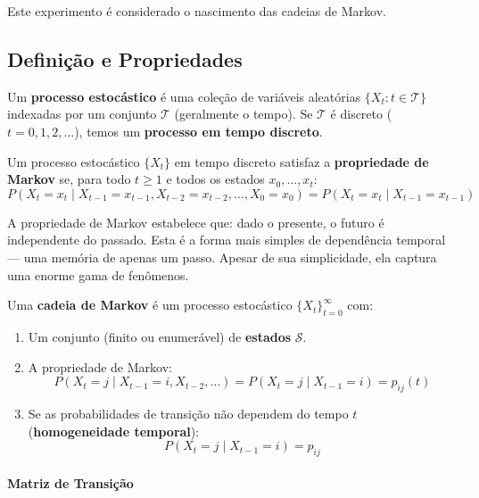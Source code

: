 \documentclass{tufte-handout}
\begin{document}
Este experimento é considerado o nascimento das cadeias de Markov.

\subsection{Definição e Propriedades}

\begin{defn}
    Um \textbf{processo estocástico} é uma coleção de variáveis aleatórias
    $\{X_t : t \in \mathcal{T}\}$ indexadas por um conjunto $\mathcal{T}$ (geralmente
    o tempo). Se $\mathcal{T}$ é discreto ($t = 0, 1, 2, \dots$), temos um
    \textbf{processo em tempo discreto}.
\end{defn}

\begin{defn}
    Um processo estocástico $\{X_t\}$ em tempo discreto satisfaz a \textbf{propriedade de Markov}
    se, para todo $t \ge 1$ e todos os estados $x_0, \dots, x_t$:
    \[
    P(X_t = x_t \mid X_{t-1} = x_{t-1}, X_{t-2} = x_{t-2}, \dots, X_0 = x_0)
    = P(X_t = x_t \mid X_{t-1} = x_{t-1})
    \]
\end{defn}

A propriedade de Markov estabelece que: dado o presente, o futuro é independente do passado.
Esta é a forma mais simples de dependência temporal --- uma memória de apenas um passo.
Apesar de sua simplicidade, ela captura uma enorme gama de fenômenos.

\begin{defn}
    Uma \textbf{cadeia de Markov} é um processo estocástico $\{X_t\}_{t=0}^\infty$ com:
    \begin{enumerate}
        \item Um conjunto (finito ou enumerável) de \textbf{estados} $\mathcal{S}$.
        \item A propriedade de Markov:
        \[
        P(X_t = j \mid X_{t-1} = i, X_{t-2}, \dots) = P(X_t = j \mid X_{t-1} = i) = p_{ij}(t)
        \]
        \item Se as probabilidades de transição não dependem do tempo $t$ (\textbf{homogeneidade temporal}):
        \[
        P(X_t = j \mid X_{t-1} = i) = p_{ij}
        \]
    \end{enumerate}
\end{defn}

\paragraph{Matriz de Transição}
\end{document}
